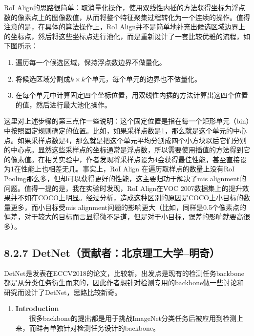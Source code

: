RoI
Align的思路很简单：取消量化操作，使用双线性内插的方法获得坐标为浮点数的像素点上的图像数值，从而将整个特征聚集过程转化为一个连续的操作。值得注意的是，在具体的算法操作上，RoI
Align并不是简单地补充出候选区域边界上的坐标点，然后将这些坐标点进行池化，而是重新设计了一套比较优雅的流程，如下图所示：

\begin{enumerate}
\def\labelenumi{\arabic{enumi}.}
\item
  遍历每一个候选区域，保持浮点数边界不做量化。
\item
  将候选区域分割成\(k\times k\)个单元，每个单元的边界也不做量化。
\item
  在每个单元中计算固定四个坐标位置，用双线性内插的方法计算出这四个位置的值，然后进行最大池化操作。
\end{enumerate}

这里对上述步骤的第三点作一些说明：这个固定位置是指在每一个矩形单元（bin）中按照固定规则确定的位置。比如，如果采样点数是1，那么就是这个单元的中心点。如果采样点数是4，那么就是把这个单元平均分割成四个小方块以后它们分别的中心点。显然这些采样点的坐标通常是浮点数，所以需要使用插值的方法得到它的像素值。在相关实验中，作者发现将采样点设为4会获得最佳性能，甚至直接设为1在性能上也相差无几。事实上，RoI
Align 在遍历取样点的数量上没有RoI
Pooling那么多，但却可以获得更好的性能，这主要归功于解决了mis
alignment的问题。值得一提的是，我在实验时发现，RoI Align在VOC
2007数据集上的提升效果并不如在COCO上明显。经过分析，造成这种区别的原因是COCO上小目标的数量更多，而小目标受mis
alignment问题的影响更大（比如，同样是0.5个像素点的偏差，对于较大的目标而言显得微不足道，但是对于小目标，误差的影响就要高很多）。

\begin{figure}
\centering
\caption{}
\end{figure}

\subsection{8.2.7
DetNet（贡献者：北京理工大学--明奇）}\label{detnetux8d21ux732eux8005ux5317ux4eacux7406ux5de5ux5927ux5b66ux660eux5947}

DetNet是发表在ECCV2018的论文，比较新，出发点是现有的检测任务backbone都是从分类任务衍生而来的，因此作者想针对检测专用的backbone做一些讨论和研究而设计了DetNet，思路比较新奇。

\begin{enumerate}
\def\labelenumi{\arabic{enumi}.}
\item
  \textbf{Introduction}\\
    很多backbone的提出都是用于挑战ImageNet分类任务后被应用到检测上来，而鲜有单独针对检测任务设计的backbone。
\end{enumerate}

